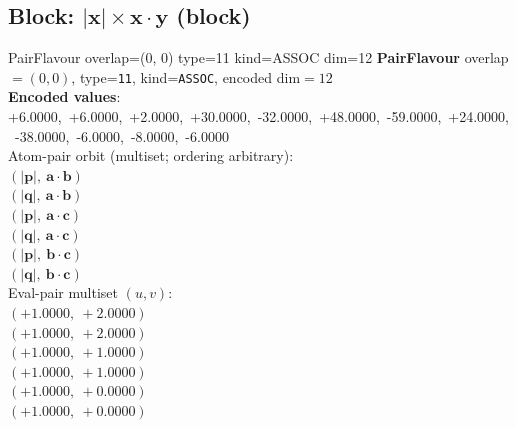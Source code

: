 \documentclass[a4paper,11pt]{article}
\newcommand{\vc}[1]{\ensuremath{\mathbf{#1}}}
\newcommand{\dnfagmiihhiejm}[1]{|\vc{#1}|}
\newcommand{\pdcegfomjfhook}[2]{\mathbf{#1} \cdot \mathbf{#2}}
\begin{document}
\subsection{Block: $\dnfagmiihhiejm{x} \times \pdcegfomjfhook{x}{y}$  (block)}
    PairFlavour  overlap=(0, 0)  type=11  kind=ASSOC  dim=12
\textbf{PairFlavour} overlap$=(0, 0)$, type=\texttt{11}, kind=\texttt{ASSOC}, encoded dim$=12$\\
\textbf{      Encoded values}: +6.0000,\ +6.0000,\ +2.0000,\ +30.0000,\ -32.0000,\ +48.0000,\ -59.0000,\ +24.0000,\ -38.0000,\ -6.0000,\ -8.0000,\ -6.0000\\
\quad Atom-pair orbit (multiset; ordering arbitrary):\\
$(\dnfagmiihhiejm{p},\ \pdcegfomjfhook{a}{b})$\\
$(\dnfagmiihhiejm{q},\ \pdcegfomjfhook{a}{b})$\\
$(\dnfagmiihhiejm{p},\ \pdcegfomjfhook{a}{c})$\\
$(\dnfagmiihhiejm{q},\ \pdcegfomjfhook{a}{c})$\\
$(\dnfagmiihhiejm{p},\ \pdcegfomjfhook{b}{c})$\\
$(\dnfagmiihhiejm{q},\ \pdcegfomjfhook{b}{c})$\\
\quad Eval-pair multiset $(u, v)$:\\
$(+1.0000,\ +2.0000)$\\
$(+1.0000,\ +2.0000)$\\
$(+1.0000,\ +1.0000)$\\
$(+1.0000,\ +1.0000)$\\
$(+1.0000,\ +0.0000)$\\
$(+1.0000,\ +0.0000)$\\
\end{document}
